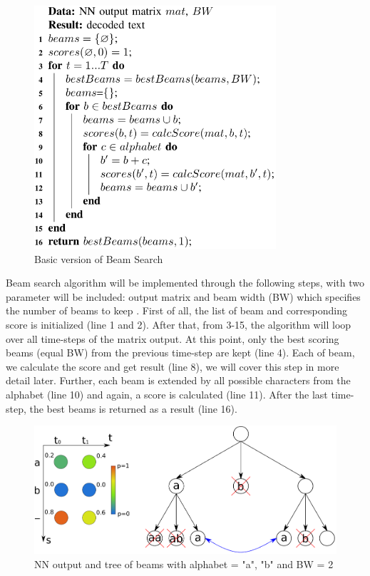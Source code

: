 \begin{figure}[H]
	\centering
	\includegraphics[width=0.8\textwidth]{img/Chap3/Basic-Version-BeamSearch}
	\caption{ Basic version of Beam Search }
	\label{fig:Chap3-Basic-Version-BeamSearch}
\end{figure}
      
      
Beam search algorithm will be implemented through the following steps, with two
parameter will be included: output matrix and beam width (BW) which specifies the number
of beams to keep . First of all, the list of beam and corresponding score is 
initialized (line 1 and 2). After that, from 3-15, the algorithm will loop over all time-steps
of the matrix output. At this point, only the best scoring beams (equal BW) from the previous
time-step are kept (line 4). Each of beam, we calculate the score and get result (line 8), we will cover
this step in more detail later. Further, each beam is extended by all possible characters from
the alphabet (line 10) and again, a score is calculated (line 11). After the last time-step,
the best beams is returned as a result (line 16).


\begin{figure}[H]
	\centering
	\includegraphics[width=\textwidth]{img/Chap3/BeamSearchTree}
	\caption{ NN output and tree of beams with alphabet = {"a", "b"} and BW = 2 }
	\label{fig:Chap3-BSTree}
\end{figure}

